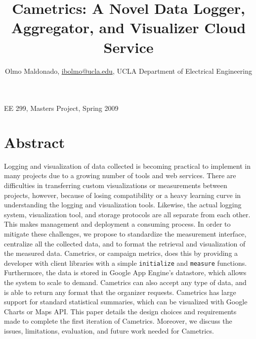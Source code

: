 \documentclass[10pt,a4paper,english]{article}
\title{}
\author{}
\date{}
\newlength{\locallinewidth}
\begin{document}
\setlength{\locallinewidth}{\linewidth}



\title{Cametrics: A Novel Data Logger, Aggregator, and Visualizer Cloud
Service}

\maketitle

\author{Olmo Maldonado, \href{mailto:ibolmo@ucla.edu}{ibolmo@ucla.edu},
UCLA Department of Electrical Engineering}
\maketitle


EE 299, Masters Project, Spring 2009

\pagebreak{}

\hypertarget{abstract}{}
\section*{Abstract}
\label{abstract}

Logging and visualization of data collected is becoming practical to implement in many projects due to a growing number of tools and web services. There are difficulties in transferring custom visualizations or measurements between projects, however, because of losing compatibility or a heavy learning curve in understanding the logging and visualization tools. Likewise, the actual logging system, visualization tool, and storage protocols are all separate from each other. This makes management and deployment a consuming process. In order to mitigate these challenges, we propose to standardize the measurement interface, centralize all the collected data, and to format the retrieval and visualization of the measured data. Cametrics, or campaign metrics, does this by providing a developer with client libraries with a simple \texttt{initialize} and \texttt{measure} functions. Furthermore, the data is stored in Google App Engine's datastore, which allows the system to scale to demand. Cametrics can also accept any type of data, and is able to return any format that the organizer requests. Cametrics has large support for standard statistical summaries, which can be visualized with Google Charts or Maps API. This paper details the design choices and requirements made to complete the first iteration of Cametrics. Moreover, we discuss the issues, limitations, evaluation, and future work needed for Cametrics.
\end{document}
